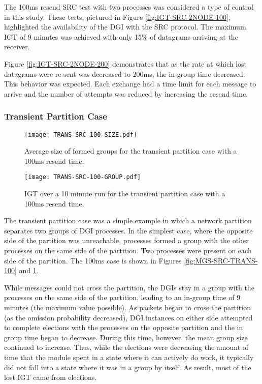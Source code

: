 The 100ms resend SRC test with two processes was considered a type of control in this study.
These tests, pictured in Figure \ref{fig:IGT-SRC-2NODE-100}, highlighted the availability of the DGI with the SRC protocol.
The maximum \ac{IGT} of 9 minutes was achieved with only 15\% of datagrams arriving at the receiver. 

Figure \ref{fig:IGT-SRC-2NODE-200} demonstrates that as the rate at which lost datagrams were re-sent was decreased to 200ms, the in-group time decreased.
This behavior was expected.
Each exchange had a time limit for each message to arrive and the number of attempts was reduced by increasing the resend time.

\subsubsection{Transient Partition Case}

\begin{figure}
\centering
\begin{minipage}{0.45\textwidth}
    \centering
    \texttt{[image: TRANS-SRC-100-SIZE.pdf]}
    \caption{Average size of formed groups for the transient partition case with a 100ms resend time.}
    \label{fig:MGS-SRC-TRANS-100}
\end{minipage}%
\qquad
\begin{minipage}{0.45\textwidth}
    \centering
    \texttt{[image: TRANS-SRC-100-GROUP.pdf]}
    \caption{\ac{IGT} over a 10 minute run for the transient partition case with a 100ms resend time.}
    \label{fig:IGT-SRC-TRANS-100}
\end{minipage}
\end{figure}

The transient partition case was a simple example in which a network partition separates two groups of DGI processes.
In the simplest case, where the opposite side of the partition was unreachable, processes formed a group with the other processes on the same side of the partition.
Two processes were present on each side of the partition.
The 100ms case is shown in Figures \ref{fig:MGS-SRC-TRANS-100} and \ref{fig:IGT-SRC-TRANS-100}.

While messages could not cross the partition, the DGIs stay in a group with the processes on the same side of the partition, leading to an in-group time of 9 minutes (the maximum value possible).
As packets began to cross the partition (as the omission probability decreased), DGI instances on either side attempted to complete elections with the processes on the opposite partition and the in group time began to decrease.
During this time, however, the mean group size continued to increase.
Thus, while the elections were decreasing the amount of time that the module spent in a state where it can actively do work, it typically did not fall into a state where it was in a group by itself. 
As result, most of the lost \ac{IGT} came from elections.

